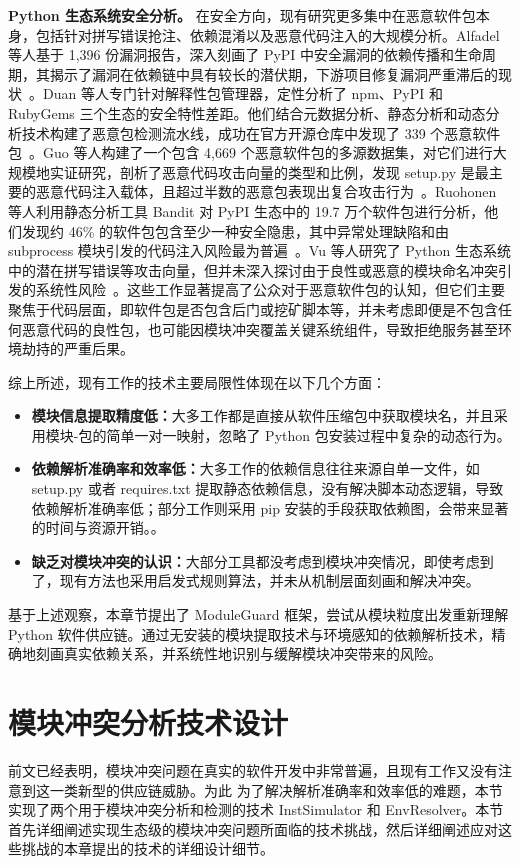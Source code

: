 \textbf{Python 生态系统安全分析。} 在安全方向，现有研究更多集中在恶意软件包本身，包括针对拼写错误抢注、依赖混淆以及恶意代码注入的大规模分析。Alfadel 等人基于 1,396 份漏洞报告，深入刻画了 PyPI 中安全漏洞的依赖传播和生命周期，其揭示了漏洞在依赖链中具有较长的潜伏期，下游项目修复漏洞严重滞后的现状~\cite{alfadel2023empirical}。Duan 等人专门针对解释性包管理器，定性分析了 npm、PyPI 和 RubyGems 三个生态的安全特性差距。他们结合元数据分析、静态分析和动态分析技术构建了恶意包检测流水线，成功在官方开源仓库中发现了 339 个恶意软件包~\cite{duan2020towards}。Guo 等人构建了一个包含 4,669 个恶意软件包的多源数据集，对它们进行大规模地实证研究，剖析了恶意代码攻击向量的类型和比例，发现 setup.py 是最主要的恶意代码注入载体，且超过半数的恶意包表现出复合攻击行为~\cite{guo2023empirical}。Ruohonen 等人利用静态分析工具 Bandit 对 PyPI 生态中的 19.7 万个软件包进行分析，他们发现约 46\% 的软件包包含至少一种安全隐患，其中异常处理缺陷和由 subprocess 模块引发的代码注入风险最为普遍~\cite{ruohonen2021large}。Vu 等人研究了 Python 生态系统中的潜在拼写错误等攻击向量，但并未深入探讨由于良性或恶意的模块命名冲突引发的系统性风险~\cite{vu2020typosquatting}。这些工作显著提高了公众对于恶意软件包的认知，但它们主要聚焦于代码层面，即软件包是否包含后门或挖矿脚本等，并未考虑即便是不包含任何恶意代码的良性包，也可能因模块冲突覆盖关键系统组件，导致拒绝服务甚至环境劫持的严重后果。

综上所述，现有工作的技术主要局限性体现在以下几个方面：

\begin{itemize}
\item \textbf{模块信息提取精度低：}大多工作都是直接从软件压缩包中获取模块名，并且采用模块-包的简单一对一映射，忽略了 Python 包安装过程中复杂的动态行为。
\item \textbf{依赖解析准确率和效率低：}大多工作的依赖信息往往来源自单一文件，如 setup.py 或者 requires.txt 提取静态依赖信息，没有解决脚本动态逻辑，导致依赖解析准确率低；部分工作则采用 pip 安装的手段获取依赖图，会带来显著的时间与资源开销。。
\item \textbf{缺乏对模块冲突的认识：}大部分工具都没考虑到模块冲突情况，即使考虑到了，现有方法也采用启发式规则算法，并未从机制层面刻画和解决冲突。
\end{itemize}

基于上述观察，本章节提出了 ModuleGuard 框架，尝试从模块粒度出发重新理解 Python 软件供应链。通过无安装的模块提取技术与环境感知的依赖解析技术，精确地刻画真实依赖关系，并系统性地识别与缓解模块冲突带来的风险。

\section{模块冲突分析技术设计}
前文已经表明，模块冲突问题在真实的软件开发中非常普遍，且现有工作又没有注意到这一类新型的供应链威胁。为此
为了解决解析准确率和效率低的难题，本节实现了两个用于模块冲突分析和检测的技术 InstSimulator 和 EnvResolver。本节首先详细阐述实现生态级的模块冲突问题所面临的技术挑战，然后详细阐述应对这些挑战的本章提出的技术的详细设计细节。

